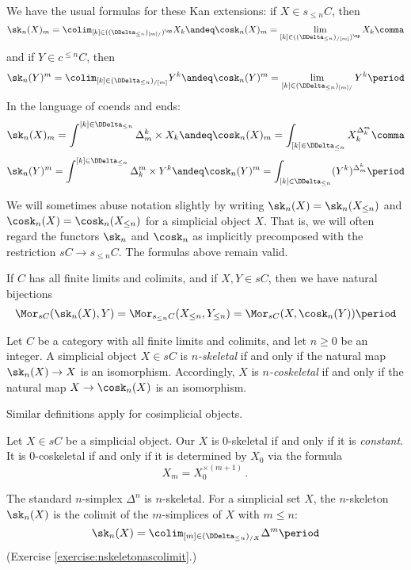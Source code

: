 We have the usual formulas for these Kan extensions:
if $X \in s_{\leq n}C$, then
\[
  \sk_n(X)_m = \colim_{[k] \in ((\DDelta_{\leq n})_{[m]/})^{\op}} X_k 
  \andeq
  \cosk_n(X)_m = \lim_{[k] \in ((\DDelta_{\leq n})_{/[m]})^{\op}} X_k \comma
\]
and if $Y \in c^{\leq n}C$, then
\[
  \sk_n(Y)^m = \colim_{[k] \in (\DDelta_{\leq n})_{/[m]}} Y^k 
  \andeq
  \cosk_n(Y)^m = \lim_{[k] \in (\DDelta_{\leq n})_{[m]/}} Y^k \period
\]
In the language of coends and ends:
\[
  \sk_n(X)_m = \int^{[k] \in \DDelta_{\leq n}} \Delta^k_m \times X_k
  \andeq
  \cosk_n(X)_m = \int_{[k] \in \DDelta_{\leq n}} X_k^{\Delta^m_k} \comma
\]
\[
  \sk_n(Y)^m = \int^{[k] \in \DDelta_{\leq n}} \Delta^m_k \times Y^k
  \andeq
  \cosk_n(Y)^m = \int_{[k] \in \DDelta_{\leq n}} (Y^k)^{\Delta^k_m} \period
\]

We will sometimes abuse notation slightly by writing $\sk_n(X) = \sk_n(X_{\leq n})$ and $\cosk_n(X) = \cosk_n(X_{\leq n})$ for a simplicial object $X$.
That is, we will often regard the functors $\sk_n$ and $\cosk_n$ as implicitly precomposed with the restriction $sC \to s_{\leq n}C$.
The formulas above remain valid.

If $C$ has all finite limits and colimits, and if $X,Y \in sC$, then we have natural bijections
\[
  \Mor_{sC}(\sk_n(X), Y) = \Mor_{s_{\leq n}C}(X_{\leq n}, Y_{\leq n}) = \Mor_{sC}(X, \cosk_n(Y)) \period
\]

\begin{definition}
  Let $C$ be a category with all finite limits and colimits, and let $n \geq 0$ be an integer.
  A simplicial object $X \in sC$ is \emph{$n$-skeletal} if and only if the natural map $\sk_n(X) \to X$ is an isomorphism.
  Accordingly, $X$ is \emph{$n$-coskeletal} if and only if the natural map $X \to \cosk_n(X)$ is an isomorphism.

  Similar definitions apply for cosimplicial objects.
\end{definition}

\begin{eg}
  Let $X \in sC$ be a simplicial object.
  Our $X$ is $0$-skeletal if and only if it is \emph{constant}.
  It is $0$-coskeletal if and only if it is determined by $X_0$ via the formula
  \[
    X_m = X_0^{\times(m+1)} \period
  \]
\end{eg}

\begin{eg}
  The standard $n$-simplex $\Delta^n$ is $n$-skeletal.
  For a simplicial set $X$, the $n$-skeleton $\sk_n(X)$ is the colimit of the $m$-simplices of $X$ with $m \leq n$:
  \[
    \sk_n(X) = \colim_{[m] \in (\DDelta_{\leq n})_{/X}} \Delta^m \period
  \]
  (Exercise \ref{exercise:nskeletonascolimit}.)
\end{eg}

